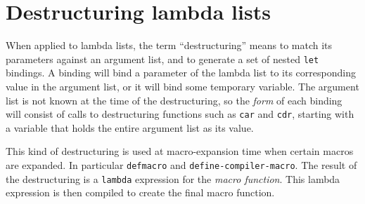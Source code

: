 \chapter{Destructuring lambda lists}
\label{chap-destructuring-lambda-lists}

When applied to lambda lists, the term ``destructuring'' means to
match its parameters against an argument list, and to generate a set
of nested \texttt{let} bindings.  A binding will bind a parameter of
the lambda list to its corresponding value in the argument list, or it
will bind some temporary variable.  The argument list is not known at
the time of the destructuring, so the \emph{form} of each binding will
consist of calls to destructuring functions such as \texttt{car} and
\texttt{cdr}, starting with a variable that holds the entire argument
list as its value.

This kind of destructuring is used at macro-expansion time when
certain macros are expanded.  In particular \texttt{defmacro} and
\texttt{define-compiler-macro}.  The result of the destructuring is a
\texttt{lambda} expression for the \emph{macro function}.  This lambda
expression is then compiled to create the final macro function.

